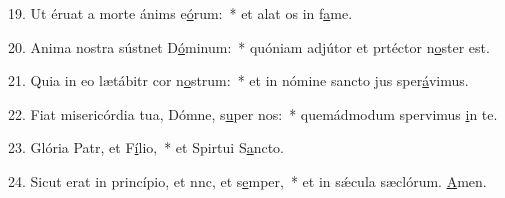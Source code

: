 19. Ut éruat a morte ánims e\uline{ó}rum:~* et alat os in f\uline{a}me.\par 
20. Anima nostra sústnet D\uline{ó}minum:~* quóniam adjútor et prtéctor n\uline{o}ster est.\par 
21. Quia in eo lætábitr cor n\uline{o}strum:~* et in nómine sancto jus sper\uline{á}vimus.\par 
22. Fiat misericórdia tua, Dómne, s\uline{u}per nos:~* quemádmodum spervimus \uline{i}n te.\par 
23. Glória Patr, et F\uline{í}lio,~* et Spirtui S\uline{a}ncto.\par 
24. Sicut erat in princípio, et nnc, et s\uline{e}mper,~* et in sǽcula sæclórum. \uline{A}men.\par 

